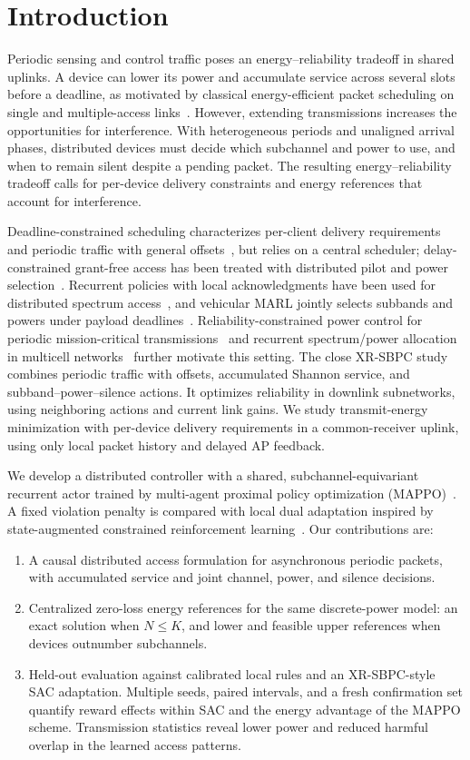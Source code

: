 \section{Introduction}
Periodic sensing and control traffic poses an energy--reliability tradeoff in
shared uplinks. A device can lower its power and accumulate service across
several slots before a deadline, as motivated by classical energy-efficient
packet scheduling on single and multiple-access links~\cite{lazy2002,uysal2004}. However, extending transmissions increases
the opportunities for interference. With heterogeneous periods and unaligned
arrival phases, distributed devices must decide which subchannel and power
to use, and when to remain silent despite a pending packet.
The resulting energy--reliability tradeoff calls for per-device delivery
constraints and energy references that account for interference.

Deadline-constrained scheduling characterizes per-client delivery
requirements~\cite{hou2010} and periodic traffic with general offsets~\cite{deng2017},
but relies on a central scheduler; delay-constrained grant-free access has been
treated with distributed pilot and power selection~\cite{bai2025}.
Recurrent policies with local acknowledgments have been used for distributed
spectrum access~\cite{naparstek2019}, and vehicular MARL jointly selects
subbands and powers under payload deadlines~\cite{liang2019}.
Reliability-constrained power control for periodic mission-critical
transmissions~\cite{guo2023} and recurrent spectrum/power allocation in
multicell networks~\cite{zhang2025} further motivate this setting.
The close XR-SBPC study~\cite{bagherinejad2025} combines periodic traffic
with offsets, accumulated Shannon service, and subband--power--silence actions.
It optimizes reliability in downlink subnetworks, using neighboring actions
and current link gains. We study transmit-energy minimization with per-device
delivery requirements in a common-receiver uplink, using only local packet
history and delayed AP feedback.

We develop a distributed controller with a shared, subchannel-equivariant
recurrent actor trained by multi-agent proximal policy optimization
(MAPPO)~\cite{yu2022}. A fixed violation penalty
is compared with local dual adaptation inspired by state-augmented
constrained reinforcement learning~\cite{calvo2024}. Our contributions are:
\begin{enumerate}
\item A causal distributed access formulation for asynchronous periodic
packets, with accumulated service and joint channel, power, and silence decisions.
\item Centralized zero-loss energy references for the same discrete-power
model: an exact solution when $N\le K$, and lower and feasible upper
references when devices outnumber subchannels.
\item Held-out evaluation against calibrated local rules and an XR-SBPC-style
SAC adaptation. Multiple seeds, paired intervals, and a fresh confirmation
set quantify reward effects within SAC and the energy advantage of the
MAPPO scheme. Transmission statistics reveal lower power and reduced
harmful overlap in the learned access patterns.
\end{enumerate}
